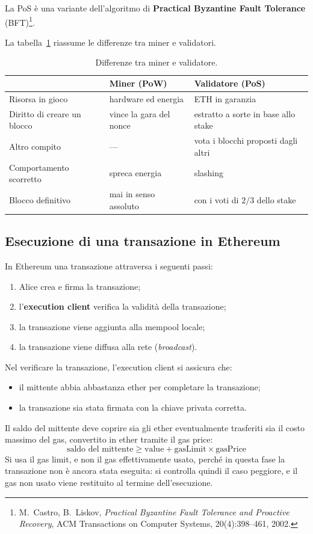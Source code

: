 \documentclass[a4paper, 11pt, oneside]{book}
\begin{document}
	La PoS è una variante dell'algoritmo di \textbf{Practical Byzantine Fault Tolerance}
	(BFT)\footnote{M.~Castro, B.~Liskov, \textit{Practical Byzantine Fault Tolerance
	and Proactive Recovery}, ACM Transactions on Computer Systems, 20(4):398--461,
	2002.}.

	La tabella~\ref{tab:miner-validatore} riassume le differenze tra miner e validatori.

	\begin{table}[H]
		\centering
		\small
		\begin{tabularx}{\textwidth}{lXX}
			\toprule
			& \textbf{Miner (PoW)} & \textbf{Validatore (PoS)} \\
			\midrule
			Risorsa in gioco & hardware ed energia & ETH in garanzia \\
			Diritto di creare un blocco & vince la gara del nonce & estratto a sorte in
				base allo stake \\
			Altro compito & --- & vota i blocchi proposti dagli altri \\
			Comportamento scorretto & spreca energia & slashing \\
			Blocco definitivo & mai in senso assoluto & con i voti di $2/3$ dello stake \\
			\bottomrule
		\end{tabularx}
		\caption{Differenze tra miner e validatore.}
		\label{tab:miner-validatore}
	\end{table}

	\subsection{Esecuzione di una transazione in Ethereum}
	In Ethereum una transazione attraversa i seguenti passi:
	\begin{enumerate}
		\item Alice crea e firma la transazione;
		\item l'\textbf{execution client} verifica la validità della transazione;
		\item la transazione viene aggiunta alla mempool locale;
		\item la transazione viene diffusa alla rete (\textit{broadcast}).
	\end{enumerate}
	Nel verificare la transazione, l'execution client si assicura che:
	\begin{itemize}
		\item il mittente abbia abbastanza ether per completare la transazione;
		\item la transazione sia stata firmata con la chiave privata corretta.
	\end{itemize}
	Il saldo del mittente deve coprire sia gli ether eventualmente trasferiti sia il
	costo massimo del gas, convertito in ether tramite il gas price:
	\[
		\text{saldo del mittente} \ge \text{value} + \text{gasLimit} \times
		\text{gasPrice}
	\]
	Si usa il gas limit, e non il gas effettivamente usato, perché in questa fase la
	transazione non è ancora stata eseguita: si controlla quindi il caso peggiore, e il
	gas non usato viene restituito al termine dell'esecuzione.
\end{document}
